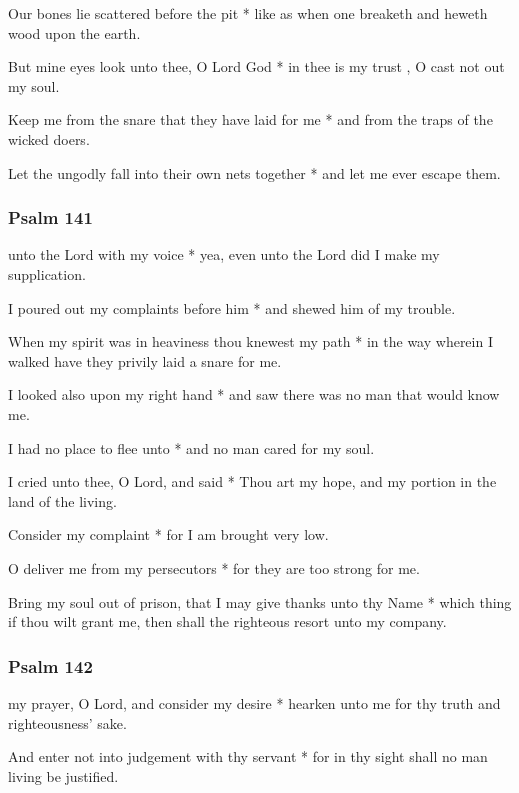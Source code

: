 Our bones lie scattered before the pit * like as when one breaketh and heweth wood upon the earth.

But mine eyes look unto thee, O Lord God * in thee is my trust , O cast not out my soul.

Keep me from the snare that they have laid for me * and from the traps of the wicked doers.

Let the ungodly fall into their own nets together * and let me ever escape them.

\subsubsection{Psalm 141}


 unto the Lord with my voice * yea, even unto the Lord did I make my supplication.

I poured out my complaints before him * and shewed him of my trouble.

When my spirit was in heaviness thou knewest my path * in the way wherein I walked have they privily laid a snare for me.

I looked also upon my right hand * and saw there was no man that would know me.

I had no place to flee unto * and no man cared for my soul.

I cried unto thee, O Lord, and said * Thou art my hope, and my portion in the land of the living.

Consider my complaint * for I am brought very low.

O deliver me from my persecutors * for they are too strong for me.

Bring my soul out of prison, that I may give thanks unto thy Name * which thing if thou wilt grant me, then shall the righteous resort unto my company.

\subsubsection{Psalm 142}


 my prayer, O Lord, and consider my desire * hearken unto me for thy truth and righteousness' sake.

And enter not into judgement with thy servant * for in thy sight shall no man living be justified.


